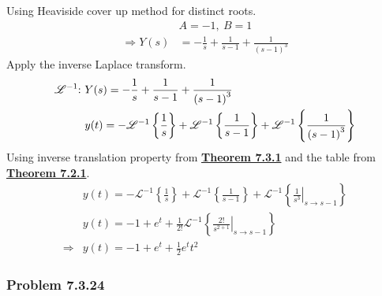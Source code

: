 \begin{solution}
  Using Heaviside cover up method for distinct roots.
  \begin{align*}
                         & A=-1, \ B=1 \\
    \Longrightarrow Y(s) &= -\frac{1}{s}+\frac{1}{s-1} + \frac{1}{\left(s-1\right)^{3}}
  \end{align*}
  Apply the inverse Laplace transform.
  \begin{align*}
     \mathscr{L}^{-1} \hspace{-0.10cm}: \ & Y(s) = -\frac{1}{s}+\frac{1}{s-1} + \frac{1}{\left(s-1\right)^{3}} \\
                                          & y(t) = - \mathscr{L}^{-1} \left\{\frac{1}{s} \right\} + \mathscr{L}^{-1} \left\{\frac{1}{s-1} \right\} 
                                                     + \mathscr{L}^{-1} \left\{\frac{1}{\left(s-1\right)^{3}} \right\}
  \end{align*}
  Using inverse translation property from \hyperlink{def:Theorem 7.3.1}{\textbf{Theorem 7.3.1}}
  and the table from \hyperlink{def:Theorem 7.2.1}{\textbf{Theorem 7.2.1}}.
  \begin{align*}
    & y(t) = - \mathscr{L}^{-1} \left\{\frac{1}{s} \right\} + \mathscr{L}^{-1} \left\{\frac{1}{s-1} \right\} 
                                                     + \mathscr{L}^{-1} \left\{\left. \frac{1}{s^{3}} \right|_{s \to s-1} \right\} \\
      & y(t) =  -1 + e^{t} + \frac{1}{2!} \mathscr{L}^{-1} \left\{\left. \frac{2!}{s^{2+1}} \right|_{s \to s-1} \right\} \\
          \Longrightarrow  & \boxed{y(t) = -1 + e^{t} + \frac{1}{2} e^{t} t^{2}}
  \end{align*}

  \end{solution}

  \subsubsection*{Problem 7.3.24}
  \vspace{-0.5cm}

